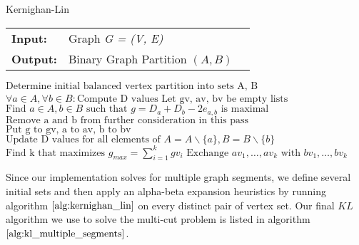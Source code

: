 \begin{algorithm}[H]
\caption{Kernighan-Lin}
\begin{table}[H]
  \begin{tabular}{@{}lll@{}}
    \textbf{Input:} & Graph \emph{G = (V, E)} \\
    \textbf{Output:} & Binary Graph Partition $\left( A, B \right)$ \\
  \end{tabular} 
\end{table}
\setlength{\fboxrule}{0pt} 
\begin{boxedminipage}{1.0\textwidth}
  \begin{algorithmic}[1]
  	  \State $\text{Determine initial balanced vertex partition into sets A, B}$
      \Do
		\State $\forall a \in A, \forall b \in B: \text{Compute D values}$
		\State $\text{Let gv, av, bv be empty lists}$
			\State $\text{Find } a \in A, b \in B \text{ such that } g = D_a + D_b - 2e_{a,b} \text{ is maximal}$
			\State $\text{Remove a and b from further consideration in this pass}$
			\State $\text{Put g to gv, a to av, b to bv}$
			\State $\text{Update D values for all elements of } A = A \backslash \{a\}, B = B \backslash \{b\}$
		\EndFor
		\State $\text{Find k that maximizes } g_{max} = \sum_{i=1}^k gv_i$
			\State $\text{Exchange } av_1,\dots, av_k \text{ with } bv_1,\dots, bv_k$  
		\EndIf	
  \end{algorithmic}
  \end{boxedminipage}
  \vskip1.5pt
\label{alg:kernighan_lin}
\end{algorithm}
Since our implementation solves for multiple graph segments, we define several initial sets and then apply an alpha-beta expansion heuristics by running algorithm $\ref{alg:kernighan_lin}$ on every distinct pair of vertex set. 
Our final $KL$ algorithm we use to solve the multi-cut problem is listed in algorithm $\ref{alg:kl_multiple_segments}$.


